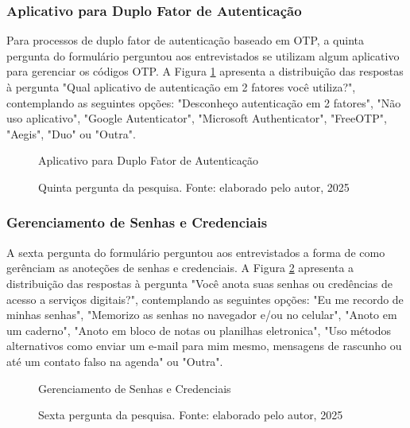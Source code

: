 \documentclass[12pt]{article}
\begin{document}
\subsubsection{Aplicativo para Duplo Fator de Autenticação}

Para processos de duplo fator de autenticação baseado em OTP, a quinta pergunta
do formulário perguntou aos entrevistados se utilizam algum aplicativo para gerenciar
os códigos OTP.
A Figura \ref{fig:resposta_5} apresenta a distribuição das respostas à pergunta "Qual
aplicativo de autenticação em 2 fatores você utiliza?", contemplando as seguintes
opções: "Desconheço autenticação em 2 fatores", "Não uso aplicativo", "Google
Autenticator", "Microsoft Authenticator", "FreeOTP", "Aegis", "Duo" ou "Outra".

\begin{figure}[!htbp]
  \centering
  \caption*{\normalfont\normalsize Aplicativo para Duplo Fator de Autenticação}
  \caption{Quinta pergunta da pesquisa. Fonte: elaborado pelo autor, 2025}
  \label{fig:resposta_5}
\end{figure}
\FloatBarrier

\subsubsection{Gerenciamento de Senhas e Credenciais}

A sexta pergunta do formulário perguntou aos entrevistados a forma de como
gerênciam as anoteções de senhas e credenciais.
A Figura \ref{fig:resposta_6} apresenta a distribuição das respostas à pergunta
"Você anota suas senhas ou credências de acesso a serviços digitais?",
contemplando as seguintes opções: "Eu me recordo de minhas senhas", "Memorizo
as senhas no navegador e/ou no celular", "Anoto em um caderno", "Anoto em bloco
de notas ou planilhas eletronica", "Uso métodos alternativos como enviar um
e-mail para mim mesmo, mensagens de rascunho ou até um contato falso na agenda"
ou "Outra".

\begin{figure}[!htbp]
  \centering
  \caption*{\normalfont\normalsize Gerenciamento de Senhas e Credenciais}
  \caption{Sexta pergunta da pesquisa. Fonte: elaborado pelo autor, 2025}
  \label{fig:resposta_6}
\end{figure}
\FloatBarrier
\end{document}
